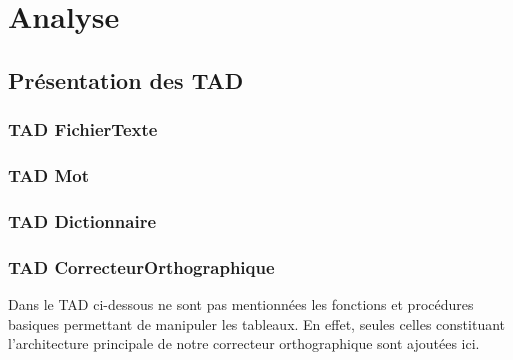 \section{Analyse}
	\subsection{Présentation des TAD}
		\subsubsection{TAD FichierTexte}
			
			
		\subsubsection{TAD Mot}
			
			
		\subsubsection{TAD Dictionnaire}
			
			
		\subsubsection{TAD CorrecteurOrthographique}
		Dans le TAD ci-dessous ne sont pas mentionnées les fonctions et procédures basiques permettant de manipuler les tableaux. En effet, seules celles constituant l'architecture principale de notre correcteur orthographique sont ajoutées ici. 
			
			
